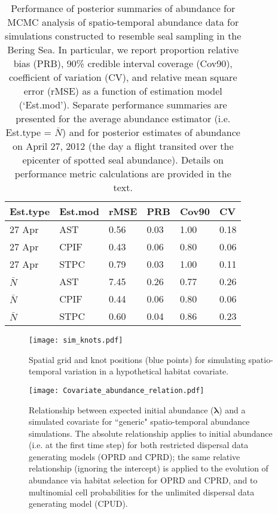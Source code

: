 \documentclass[12pt,fleqn]{article}
\begin{document}
\begin{flushleft}
\begin{table}[ht]
\caption{Performance of posterior summaries of abundance for MCMC analysis of spatio-temporal abundance data for simulations constructed to resemble seal sampling in the Bering Sea.  In particular, we report proportion relative bias (PRB), 90\% credible interval coverage (Cov90), coefficient of variation (CV), and relative mean square error (rMSE) as a function of estimation model (`Est.mod'). Separate performance summaries are presented for the average abundance estimator (i.e. Est.type = $\bar{N}$) and for posterior estimates of abundance on April 27, 2012 (the day a flight transited over the epicenter of spotted seal abundance).  Details on performance metric calculations are provided in the text.}
\label{tab:sim_Bering_results}
\begin{tabular}{llllll}
  \hline
Est.type & Est.mod & rMSE & PRB & Cov90 & CV  \\
  \hline
  27 Apr & AST & 0.56 & 0.03 & 1.00 & 0.18 \\
  27 Apr & CPIF & 0.43 & 0.06 & 0.80 & 0.06 \\
  27 Apr & STPC & 0.79 & 0.03 & 1.00 & 0.11 \\
  $\bar{N}$ & AST & 7.45 & 0.26 & 0.77 & 0.26  \\
  $\bar{N}$  & CPIF & 0.44 & 0.06 & 0.80 & 0.06 \\
  $\bar{N}$  & STPC & 0.60 & 0.04 & 0.86 & 0.23 \\
   \hline
\end{tabular}
\end{table}

\clearpage

\begin{figure*}
\begin{center}
\texttt{[image: sim\_knots.pdf]}
\caption{Spatial grid and knot positions (blue points) for simulating spatio-temporal variation in a hypothetical habitat covariate.} \label{fig:sim-hab}
\end{center}
\end{figure*}

\pagebreak

\begin{figure*}
\begin{center}
\texttt{[image: Covariate\_abundance\_relation.pdf]}
\caption{Relationship between expected initial abundance ($\boldsymbol{\lambda}$) and a simulated covariate for ``generic" spatio-temporal abundance simulations.  The absolute relationship applies to initial abundance (i.e. at the first time step) for both restricted dispersal data generating models (OPRD and CPRD); the same relative relationship (ignoring the intercept) is applied to the evolution of abundance via habitat selection for OPRD and CPRD, and to multinomial cell probabilities for the unlimited dispersal data generating model (CPUD).} \label{fig:cov-relation}
\end{center}
\end{figure*}


\end{flushleft}
\end{document}
